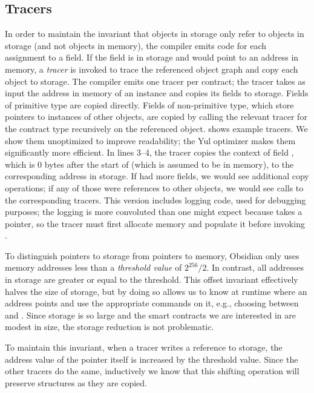 \subsection{Tracers}
In order to maintain the invariant that objects in storage only refer to objects in storage (and not objects in memory), the compiler emits code for each assignment to a field. If the field is in storage and would point to an address in memory, a \emph{tracer} is invoked to trace the referenced object graph and copy each object to storage. The compiler emits one tracer per contract; the tracer takes as input the address
in memory of an instance and copies its fields to
storage. Fields of primitive type are copied directly. Fields of
non-primitive type, which store pointers to instances of other objects, are
copied by calling the relevant tracer for the contract type recursively on
the referenced object.  shows example tracers. We show them unoptimized to improve readability; the Yul optimizer makes them significantly more efficient. In lines 3--4, the tracer copies the context of field , which is 0 bytes after the start of  (which is assumed to be in memory), to the corresponding address in storage. If  had more fields, we would see additional copy operations; if any of those were references to other objects, we would see calls to the corresponding tracers. This version includes logging code, used for debugging purposes; the logging is more convoluted than one might expect because  takes a pointer, so the tracer must first allocate memory and populate it before invoking .

To distinguish pointers to storage from pointers to memory, Obsidian only uses memory addresses less than
a \emph{threshold value} of $2^{256}/2$. In contrast, all addresses in storage are greater or equal to
the threshold. This offset invariant effectively halves the size of storage, but
by doing so allows us to know at runtime where an address points and use the
appropriate commands on it, e.g., choosing between 
and . Since storage is so large and the smart contracts we
are interested in are modest in size, the storage reduction is not
problematic.

To maintain this invariant, when a tracer writes a reference to storage,
the address value of the pointer itself is increased by the threshold
value. Since the other tracers do the same, inductively we know that this
shifting operation will preserve structures as they are copied.

